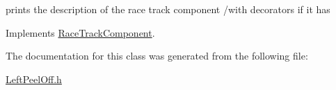 prints the description of the race track component /with decorators if it has 

Implements \mbox{\hyperlink{class_race_track_component_a02a8d9520cfd80f31dd94b5fa1e76d47}{Race\+Track\+Component}}.



The documentation for this class was generated from the following file\+:\begin{DoxyCompactItemize}
\item 
\mbox{\hyperlink{_left_peel_off_8h}{Left\+Peel\+Off.\+h}}\end{DoxyCompactItemize}
